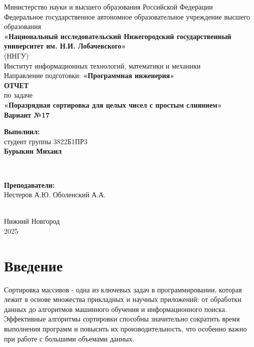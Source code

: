 \documentclass[12pt]{article}
\begin{document}
\begin{titlepage}
    \centering
    \large
    Министерство науки и высшего образования Российской Федерации\\[0.5cm]
    Федеральное государственное автономное образовательное учреждение высшего образования\\[0.5cm]
    \textbf{«Национальный исследовательский Нижегородский государственный университет им. Н.И. Лобачевского»}\\
    (ННГУ)\\[1cm]
    Институт информационных технологий, математики и механики\\[0.5cm]
    Направление подготовки: \textbf{«Программная инженерия»}\\[2cm]

    \vfill
    {\LARGE \textbf{ОТЧЕТ}}\\[0.5cm]
    {\Large по задаче}\\[0.5cm]
    {\LARGE \textbf{«Поразрядная сортировка для целых чисел с простым слиянием»}}\\[0.5cm]
    {\Large \textbf{Вариант №17}}\\[2.5cm]

    \hfill\parbox{0.5\textwidth}{
        \textbf{Выполнил:} \\
        студент группы 3822Б1ПР3 \\
        \textbf{Бурыкин Михаил}
    }\\[0.5cm]

    \hfill\parbox{0.5\textwidth}{
        \textbf{Преподаватели:} \\
        Нестеров А.Ю.
        Оболенский А.А.

    }\\[2cm]

    Нижний Новгород\\
    2025
\end{titlepage}


\thispagestyle{empty}
\clearpage
{} 
\setcounter{page}{2} 
\tableofcontents
\clearpage
\setcounter{page}{3} 
\section{Введение}

\hspace*{1.25em}Сортировка массивов - одна из ключевых задач в программировании, которая лежит в основе множества прикладных и научных приложений: от обработки данных до алгоритмов машинного обучения и информационного поиска. Эффективные алгоритмы сортировки способны значительно сократить время выполнения программ и повысить их производительность, что особенно важно при работе с большими объемами данных.
\end{document}
